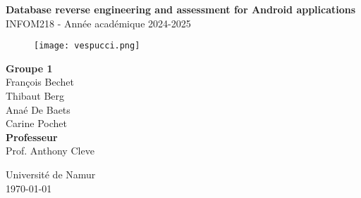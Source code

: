 \documentclass[a4paper,11pt]{article}
\begin{document}
\begin{titlepage}
    \begin{center}
        \vspace*{2cm}
        \Huge\textbf{Database reverse engineering and assessment for
            Android applications}\\
        \vspace{1cm}
        \Large INFOM218 - Année académique 2024-2025\\
        \begin{figure}[!ht]
            \centering
            \texttt{[image: vespucci.png]}
            \label{fig:logo-vespucci}
        \end{figure}
        {\Large\textbf{Groupe 1}}\\
        \vspace{0.5cm}
        {\Large François Bechet\\
            Thibaut Berg}\\
        Anaé De Baets\\
        Carine Pochet\\
        \vspace{1cm}
        {\Large\textbf{Professeur}}\\
        \vspace{0.5cm}
        {\Large Prof. Anthony Cleve}\\
        \vfill
        \begin{figure}[!ht]
            \centering
            
            \label{fig:logo-unamur}
        \end{figure}
        \Large Université de Namur\\
        \Large \today
    \end{center}
\end{titlepage}

\tableofcontents
\newpage


\newpage

\newpage

\newpage

\newpage
\end{document}
